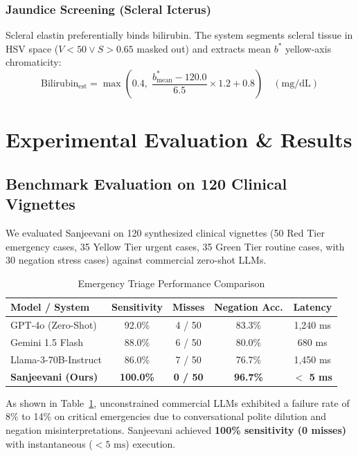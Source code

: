 \documentclass[conference]{IEEEtran}
\begin{document}
\subsubsection{Jaundice Screening (Scleral Icterus)}
Scleral elastin preferentially binds bilirubin. The system segments scleral tissue in HSV space ($V < 50 \lor S > 0.65$ masked out) and extracts mean $b^*$ yellow-axis chromaticity:
\begin{equation}
\text{Bilirubin}_{\text{est}} = \max\left(0.4, \; \frac{b^*_{\text{mean}} - 120.0}{6.5} \times 1.2 + 0.8\right) \quad (\text{mg/dL})
\end{equation}

\section{Experimental Evaluation \& Results}

\subsection{Benchmark Evaluation on 120 Clinical Vignettes}
We evaluated Sanjeevani on 120 synthesized clinical vignettes (50 Red Tier emergency cases, 35 Yellow Tier urgent cases, 35 Green Tier routine cases, with 30 negation stress cases) against commercial zero-shot LLMs.

\begin{table}[htbp]
\caption{Emergency Triage Performance Comparison}
\begin{center}
\begin{tabular}{lcccc}
\toprule
\textbf{Model / System} & \textbf{Sensitivity} & \textbf{Misses} & \textbf{Negation Acc.} & \textbf{Latency} \\
\midrule
GPT-4o (Zero-Shot) & 92.0\% & 4 / 50 & 83.3\% & 1,240 ms \\
Gemini 1.5 Flash & 88.0\% & 6 / 50 & 80.0\% & 680 ms \\
Llama-3-70B-Instruct & 86.0\% & 7 / 50 & 76.7\% & 1,450 ms \\
\textbf{Sanjeevani (Ours)} & \textbf{100.0\%} & \textbf{0 / 50} & \textbf{96.7\%} & \textbf{$<$ 5 ms} \\
\bottomrule
\end{tabular}
\label{tab:triage_results}
\end{center}
\end{table}

As shown in Table~\ref{tab:triage_results}, unconstrained commercial LLMs exhibited a failure rate of 8\% to 14\% on critical emergencies due to conversational polite dilution and negation misinterpretations. Sanjeevani achieved \textbf{100\% sensitivity (0 misses)} with instantaneous ($<5\text{ ms}$) execution.
\end{document}
